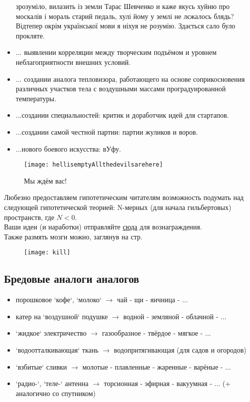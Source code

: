 \begin{itemize}
{            зрозуміло, вилазить із земли Тарас Шевченко и каже якусь хуйню про москалів і мораль старий педаль, 
            хулі йому у землі не лєжалось блядь? Відтепер окрім української мови я ніхуя не розумію. Здається 
            сало було прокляте.}
    \item ... выявлении корреляции между творческим подъёмом и уровнем неблагоприятности внешних условий.
    \item ... создании аналога тепловизора, работающего на основе соприкосновения различных участков тела с воздушными массами проградуированной температуры.
    \item ...создании специальностей: критик и доработчик идей для стартапов.
    \item ...создании самой честной партии: партии жуликов и воров.
    \item ...нового боевого искусства: вУфу.
\end{itemize}
\begin{figure}[ht!]
    \centering
    \texttt{[image: hellisemptyAllthedevilsarehere]}
    \caption{Мы ждём вас!}
\end{figure}

Любезно предоставляем гипотетическим читателям возможность подумать над следующей гипотетической теорией:
N-мерных (для начала гильбертовых) пространств, где \( N < 0 \).\\
Ваши идеи (и наработки) отправляйте \href{http://www.abelprize.no/}{сюда} для вознаграждения.\\
Также размять мозги можно, заглянув на стр. \pageref{mietka}
\begin{figure}[ht!]
    \centering
    \texttt{[image: kill]}
\end{figure}

\subsection{Бредовые аналоги аналогов}
\begin{itemize}
    \item порошковое `кофе`, `молоко` \( \to \) чай - щи - яичница - ...
    \item катер на `воздушной` подушке \( \to \) водной - земляной - облачной - ...
    \item `жидкое` электричество \( \to \) газообразное - твёрдое - мягкое - ...
    \item `водоотталкивающая` ткань \( \to \) водопритягивающая (для садов и огородов)
    \item `взбитые` сливки \( \to \) молотые - плавленные - жаренные - варёные - ...
    \item `радио-`, `теле-` антенна \( \to \) торсионная - эфирная - вакуумная - ... (+ аналогично со спутником)
\end{itemize}

